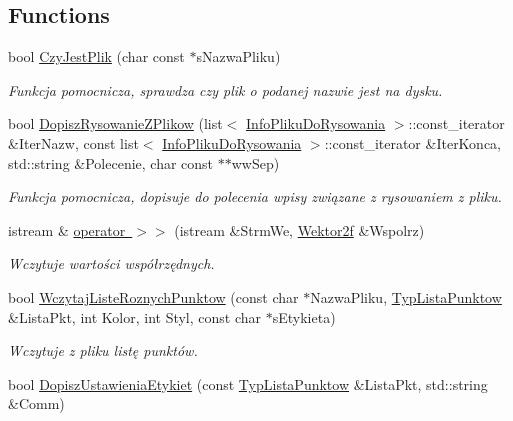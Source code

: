 \subsection*{Functions}
\begin{DoxyCompactItemize}
\item 
bool \mbox{\hyperlink{namespace_pz_g_ae1aad0c681853d7e47da4cdfccefc102}{Czy\+Jest\+Plik}} (char const $\ast$s\+Nazwa\+Pliku)
\begin{DoxyCompactList}\small\item\em Funkcja pomocnicza, sprawdza czy plik o podanej nazwie jest na dysku. \end{DoxyCompactList}\item 
bool \mbox{\hyperlink{namespace_pz_g_aa010184f31b26bb561b42f22438b821e}{Dopisz\+Rysowanie\+Z\+Plikow}} (list$<$ \mbox{\hyperlink{class_pz_g_1_1_info_pliku_do_rysowania}{Info\+Pliku\+Do\+Rysowania}} $>$\+::const\+\_\+iterator \&Iter\+Nazw, const list$<$ \mbox{\hyperlink{class_pz_g_1_1_info_pliku_do_rysowania}{Info\+Pliku\+Do\+Rysowania}} $>$\+::const\+\_\+iterator \&Iter\+Konca, std\+::string \&Polecenie, char const $\ast$$\ast$ww\+Sep)
\begin{DoxyCompactList}\small\item\em Funkcja pomocnicza, dopisuje do polecenia wpisy związane z rysowaniem z pliku. \end{DoxyCompactList}\item 
istream \& \mbox{\hyperlink{namespace_pz_g_a0ec9d1eae11f50a30ac2e42574bebd52}{operator $>$$>$}} (istream \&Strm\+We, \mbox{\hyperlink{class_pz_g_1_1_wektor2f}{Wektor2f}} \&Wspolrz)
\begin{DoxyCompactList}\small\item\em Wczytuje wartości współrzędnych. \end{DoxyCompactList}\item 
bool \mbox{\hyperlink{namespace_pz_g_a169c311f0e0b6ffadcd44e91e749f72d}{Wczytaj\+Liste\+Roznych\+Punktow}} (const char $\ast$Nazwa\+Pliku, \mbox{\hyperlink{namespace_pz_g_a663e923efc195ea10f6f7086c6da490b}{Typ\+Lista\+Punktow}} \&Lista\+Pkt, int Kolor, int Styl, const char $\ast$s\+Etykieta)
\begin{DoxyCompactList}\small\item\em Wczytuje z pliku listę punktów. \end{DoxyCompactList}\item 
bool \mbox{\hyperlink{namespace_pz_g_ae6b9705e199ad695b61b4e902eaf0d6c}{Dopisz\+Ustawienia\+Etykiet}} (const \mbox{\hyperlink{namespace_pz_g_a663e923efc195ea10f6f7086c6da490b}{Typ\+Lista\+Punktow}} \&Lista\+Pkt, std\+::string \&Comm)
$$
\end{DoxyCompactItemize}

